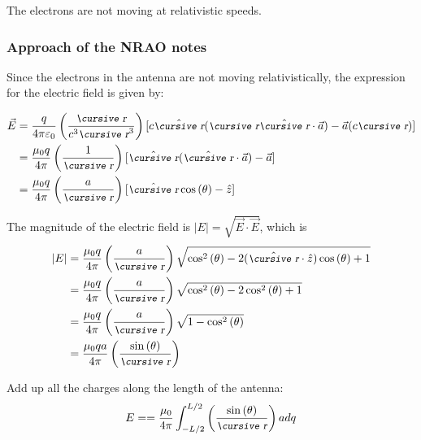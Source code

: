 \documentclass[12pt]{article}
\begin{document}
\begin{flushleft}
The electrons are not moving at relativistic speeds.

\subsubsection*{Approach of the NRAO notes}

Since the electrons in the antenna are not moving relativistically, the expression for the electric field is given by:

\begin{equation*}
\begin{aligned}
\vec{E}  & = \frac{q}{4\pi \varepsilon_{0}} \left( \frac{\text{\small\slshape\cursive r}}{c^{3}\text{\small\slshape\cursive r}^{3}} \right) [c\hat{\text{\small\slshape\cursive r}}(\text{\small\slshape\cursive r}\hat{\text{\small\slshape\cursive r}} \cdot \vec{a})-\vec{a}(c\text{\small\slshape\cursive r}) ] \\
 &  = \frac{\mu_{0}q}{4\pi} \left( \frac{1}{\text{\small\slshape\cursive r}} \right) [\hat{\text{\small\slshape\cursive r}}(\hat{\text{\small\slshape\cursive r}} \cdot \vec{a})-\vec{a} ] \\
 &  = \frac{\mu_{0}q}{4\pi} \left( \frac{a}{\text{\small\slshape\cursive r}} \right) [\hat{\text{\small\slshape\cursive r}}\cos{(\theta)}-\hat{z} ]
\end{aligned}
\end{equation*}

The magnitude of the electric field is $|E|=\sqrt{\vec{E} \cdot \vec{E}}$, which is
\begin{equation*}
\begin{aligned}
|E| &  = \frac{\mu_{0}q}{4\pi} \left( \frac{a}{\text{\small\slshape\cursive r}} \right) \sqrt{\cos^{2}{(\theta)}-2(\hat{\text{\small\slshape\cursive r}} \cdot \hat{z}) \cos{(\theta)} +1} \\
  &  = \frac{\mu_{0}q}{4\pi} \left( \frac{a}{\text{\small\slshape\cursive r}} \right) \sqrt{\cos^{2}{(\theta)}-2\cos^{2}{(\theta)} +1} \\
   &  = \frac{\mu_{0}q}{4\pi} \left( \frac{a}{\text{\small\slshape\cursive r}} \right) \sqrt{1-\cos^{2}{(\theta)}} \\
     &  = \frac{\mu_{0}qa}{4\pi} \left( \frac{\sin{(\theta)}}{\text{\small\slshape\cursive r}} \right) 
\end{aligned}
\end{equation*}

Add up all the charges along the length of the antenna:
\[
E = = \frac{ \mu_{0} }{4\pi} \int_{-L/2}^{L/2} \left( \frac{\sin{(\theta)}}{\text{\small\slshape\cursive r}} \right) a dq 
\]


\end{flushleft}
\end{document}

